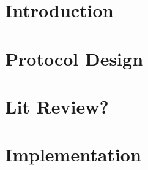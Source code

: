 \documentclass[12pt,dvips]{report}
\begin{document}
\pagebreak


\tableofcontents
\pagebreak

\listoffigures
\pagebreak

\listoftables
\pagebreak

\pagestyle{myheadings}

\chapter{Introduction}

\chapter{Protocol Design}

\chapter{Lit Review?}

\chapter{Implementation}
\end{document}
